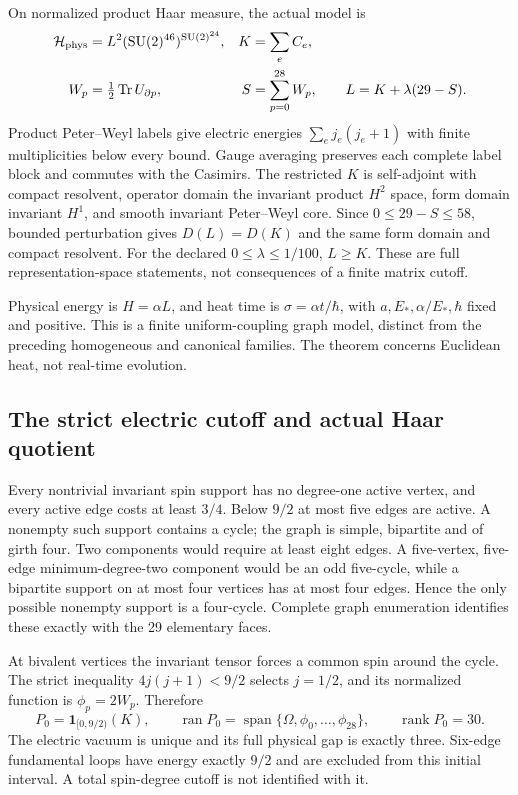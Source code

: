 On normalized product Haar measure, the actual model is
\begin{align}
 \mathcal H_{\rm phys}&=L^2(\mathrm{SU}(2)^{46})^{\mathrm{SU}(2)^{24}},
 &K&=\sum_e C_e,\notag\\
 W_p&=\tfrac12\operatorname{Tr}U_{\partial p},
 &S&=\sum_{p=0}^{28}W_p,\qquad L=K+\lambda(29-S).
 \label{eq:ah1-model}
\end{align}
Product Peter--Weyl labels give electric energies $\sum_ej_e(j_e+1)$ with finite multiplicities below every bound. Gauge averaging preserves each complete label block and commutes with the Casimirs. The restricted $K$ is self-adjoint with compact resolvent, operator domain the invariant product $H^2$ space, form domain invariant $H^1$, and smooth invariant Peter--Weyl core. Since $0\le29-S\le58$, bounded perturbation gives $D(L)=D(K)$ and the same form domain and compact resolvent. For the declared $0\le\lambda\le1/100$, $L\ge K$. These are full representation-space statements, not consequences of a finite matrix cutoff.

Physical energy is $H=\alpha L$, and heat time is $\sigma=\alpha t/\hbar$, with $a,E_*,\alpha/E_*,\hbar$ fixed and positive. This is a finite uniform-coupling graph model, distinct from the preceding homogeneous and canonical families. The theorem concerns Euclidean heat, not real-time evolution.

\subsection{The strict electric cutoff and actual Haar quotient}
Every nontrivial invariant spin support has no degree-one active vertex, and every active edge costs at least $3/4$. Below $9/2$ at most five edges are active. A nonempty such support contains a cycle; the graph is simple, bipartite and of girth four. Two components would require at least eight edges. A five-vertex, five-edge minimum-degree-two component would be an odd five-cycle, while a bipartite support on at most four vertices has at most four edges. Hence the only possible nonempty support is a four-cycle. Complete graph enumeration identifies these exactly with the 29 elementary faces.

At bivalent vertices the invariant tensor forces a common spin around the cycle. The strict inequality $4j(j+1)<9/2$ selects $j=1/2$, and its normalized function is $\phi_p=2W_p$. Therefore
\begin{equation}
 P_0=\mathbf1_{[0,9/2)}(K),\qquad
 \operatorname{ran}P_0=\operatorname{span}\{\Omega,\phi_0,\ldots,\phi_{28}\},
 \qquad\operatorname{rank}P_0=30.
 \label{eq:ah1-strict}
\end{equation}
The electric vacuum is unique and its full physical gap is exactly three. Six-edge fundamental loops have energy exactly $9/2$ and are excluded from this initial interval. A total spin-degree cutoff is not identified with it.

